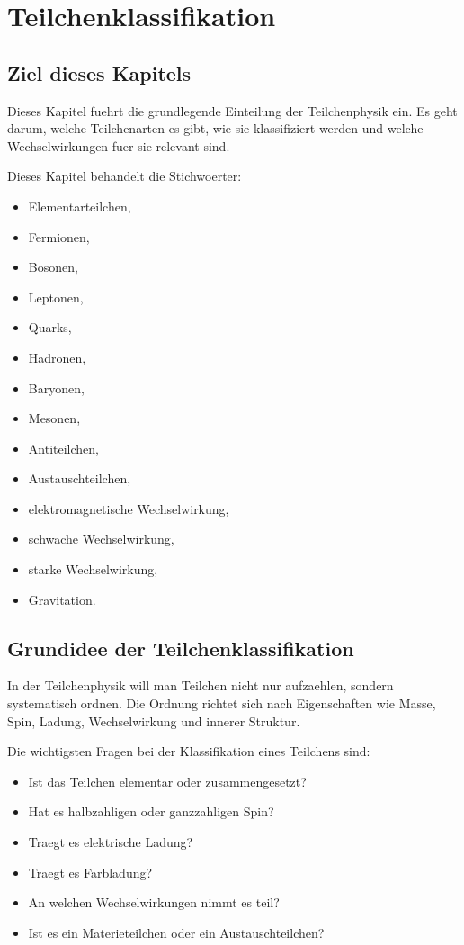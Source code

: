 \chapter{Teilchenklassifikation}

\section{Ziel dieses Kapitels}

Dieses Kapitel fuehrt die grundlegende Einteilung der Teilchenphysik ein.
Es geht darum, welche Teilchenarten es gibt, wie sie klassifiziert werden und welche
Wechselwirkungen fuer sie relevant sind.

\begin{notebox}
Dieses Kapitel behandelt die Stichwoerter:
\begin{itemize}
    \item Elementarteilchen,
    \item Fermionen,
    \item Bosonen,
    \item Leptonen,
    \item Quarks,
    \item Hadronen,
    \item Baryonen,
    \item Mesonen,
    \item Antiteilchen,
    \item Austauschteilchen,
    \item elektromagnetische Wechselwirkung,
    \item schwache Wechselwirkung,
    \item starke Wechselwirkung,
    \item Gravitation.
\end{itemize}
\end{notebox}

\section{Grundidee der Teilchenklassifikation}

In der Teilchenphysik will man Teilchen nicht nur aufzaehlen, sondern systematisch
ordnen.
Die Ordnung richtet sich nach Eigenschaften wie Masse, Spin, Ladung, Wechselwirkung
und innerer Struktur.

\begin{conceptbox}
Die wichtigsten Fragen bei der Klassifikation eines Teilchens sind:
\begin{itemize}
    \item Ist das Teilchen elementar oder zusammengesetzt?
    \item Hat es halbzahligen oder ganzzahligen Spin?
    \item Traegt es elektrische Ladung?
    \item Traegt es Farbladung?
    \item An welchen Wechselwirkungen nimmt es teil?
    \item Ist es ein Materieteilchen oder ein Austauschteilchen?
\end{itemize}
\end{conceptbox}


